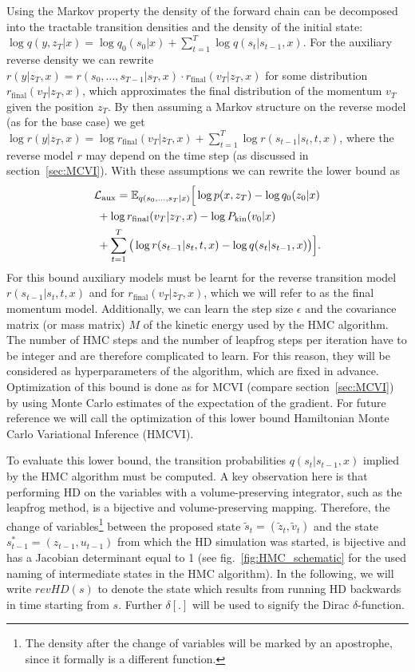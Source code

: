 Using the Markov property the density of the forward chain can be decomposed into the tractable transition densities and the density of the initial state: $\log q(y, z_T|x) = \log q_0(s_0|x) + \sum_{t=1}^T \log q(s_t|s_{t-1}, x)$. For the auxiliary reverse density we can rewrite $r(y | z_T, x) = r(s_0, \ldots, s_{T-1}| s_T, x) \cdot r_{\textrm{final}}(v_T | z_T, x)$ for some distribution $r_{\textrm{final}}(v_T|z_T, x)$, which approximates the final distribution of the momentum $v_T$ given the position $z_T$. By then assuming a Markov structure on the reverse model (as for the base case) we get $\log r(y | z_T, x) = \log r_{\textrm{final}}(v_T | z_T, x) + \sum_{t=1}^T \log r(s_{t-1}|s_t, t, x)$, where the reverse model $r$ may depend on the time step (as discussed in section~\ref{sec:MCVI}). With these assumptions we can rewrite the lower bound as
\begin{equation} \label{eq:HMCVIAuxLowerBound}
\begin{split}
&\mathcal{L_\textrm{aux}} = \mathbb{E}_{q(s_0, \ldots, s_T|x)} \Big[ \log p(x, z_T) - \log q_0(z_0|x) \\
&\;+ \log r_{\textrm{final}}(v_T | z_T, x) - \log P_\textrm{kin}(v_0|x)  \\ 
&\;+ \sum \limits_{t=1}^T \big( \log r(s_{t-1}|s_t, t, x) - \log q(s_t|s_{t-1}, x) \big) \Big].
\end{split}
\end{equation}
For this bound auxiliary models must be learnt for the reverse transition model $r(s_{t-1}|s_t, t, x)$ and for $r_{\textrm{final}}(v_T | z_T, x)$, which we will refer to as the final momentum model. Additionally, we can learn the step size $\epsilon$ and the covariance matrix (or mass matrix) $M$ of the kinetic energy used by the HMC algorithm. The number of HMC steps and the number of leapfrog steps per iteration have to be integer and are therefore complicated to learn. For this reason, they will be considered as hyperparameters of the algorithm, which are fixed in advance. Optimization of this bound is done as for MCVI (compare section~\ref{sec:MCVI}) by using Monte Carlo estimates of the expectation of the gradient. For future reference we will call the optimization of this lower bound Hamiltonian Monte Carlo Variational Inference (HMCVI).

To evaluate this lower bound, the transition probabilities $q(s_t|s_{t-1}, x)$ implied by the HMC algorithm must be computed. A key observation here is that performing HD on the variables with a volume-preserving integrator, such as the leapfrog method, is a bijective and volume-preserving mapping. Therefore, the change of variables\footnote{The density after the change of variables will be marked by an apostrophe, since it formally is a different function.} between the proposed state $\tilde{s}_t = (\tilde{z}_t, \tilde{v}_t)$ and the state $s^*_{t-1} = (z_{t-1}, u_{t-1})$ from which the HD simulation was started, is bijective and has a Jacobian determinant equal to 1 (see fig.~\ref{fig:HMC_schematic} for the used naming of intermediate states in the HMC algorithm). In the following, we will write $revHD(s)$ to denote the state which results from running HD backwards in time starting from $s$. Further $\delta[.]$ will be used to signify the Dirac $\delta$-function.

